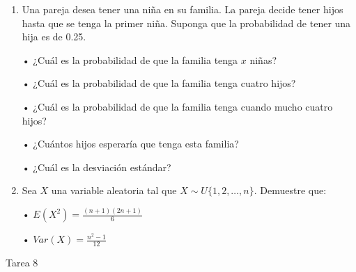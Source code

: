 \documentclass[a4paper, 12pt]{article}
\newcommand{\Pspace}{0.5cm}
\newcommand{\Aspace}{0.2cm}
\begin{document}
\begin{enumerate}
    \vspace{\Pspace}
    \item Una pareja desea tener una niña en su familia. La pareja decide tener hijos hasta que se tenga la primer niña. Suponga que la probabilidad de tener una hija es de 0.25. 
    \vspace{\Aspace} \par
    • ¿Cuál es la probabilidad de que la familia tenga $x$ niñas?
    \\ { \color{azul}  }

    \vspace{\Aspace} \par
    • ¿Cuál es la probabilidad de que la familia tenga cuatro hijos?
    \\ { \color{azul}  }

    \vspace{\Aspace} \par
    • ¿Cuál es la probabilidad de que la familia tenga cuando mucho cuatro hijos?
    \\ { \color{azul}  }

    \vspace{\Aspace} \par
    • ¿Cuántos hijos esperaría que tenga esta familia?
    \\ { \color{azul}  }

    \vspace{\Aspace} \par
    • ¿Cuál es la desviación estándar?
    \\ { \color{azul}  }


    \vspace{\Pspace}
    \item Sea $X$ una variable aleatoria tal que $ X \sim U\{1, 2, \dots, n\} $. Demuestre que:
    \vspace{\Aspace} \par
    • $E(X^{2}) = \frac{(n + 1)(2n + 1)}{6}$
    \\ { \color{azul}  }

    \vspace{\Aspace} \par
    • $Var(X) = \frac{n^{2} - 1}{12}$ 
    \\ { \color{azul}  }
\end{enumerate}



\newpage
\begin{center}
    { \LARGE Tarea 8}
\end{center}
\end{document}
